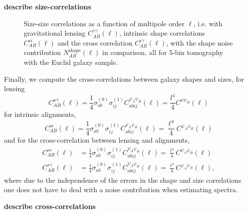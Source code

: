 \documentclass[a4paper,fleqn,usenatbib]{mnras}
\def\spirou#1{{\bf #1}}
\begin{document}
\spirou{describe size-correlations}


\begin{figure}
\centering
\caption{Size-size correlations as a function of multipole order $\ell$, i.e. with gravitational lensing $C_{AB}^{\gamma\gamma}(\ell)$, intrinsic shape correlations $C_{AB}^{\epsilon\epsilon}(\ell)$ and the cross correlation $C_{AB}^{\epsilon\gamma}(\ell)$, with the shape noise contribution $N_{AB}^\mathrm{shape}(\ell)$ in comparison, all for 5-bin tomography with the Euclid galaxy sample.}
\label{fig:sizesize}
\end{figure}


Finally, we compute the cross-correlations between galaxy shapes and sizes, for lensing
\begin{equation}
C_{AB}^{\kappa\gamma}(\ell) = \frac{1}{4}\sigma^{(0)}_{ab}\sigma^{(1)}_{ij}C^{\psi_A\psi_B}_{abij}(\ell) = \frac{l^4}{4}C^{\psi\psi_B}(\ell)
\end{equation}
for intrinsic alignments,
\begin{equation}
C_{AB}^{s\epsilon}(\ell) = \frac{1}{4}\sigma^{(0)}_{ab}\sigma^{(1)}_{ij}C^{\varphi_A\varphi_B}_{abij}(\ell) = \frac{\ell^4}{4}C^{\varphi_A\varphi_B}(\ell)
\end{equation}
and for the cross-correlation between lensing and alignments,
\begin{align}
C_{AB}^{\kappa\epsilon}(\ell) & = \frac{1}{4}\sigma^{(0)}_{ab}\sigma^{(1)}_{ij}C^{\psi_A\varphi_B}_{abij}(\ell) = \frac{\ell^4}{4}C^{\psi_A\varphi_B}(\ell)\\
C_{AB}^{s\gamma}(\ell) & = \frac{1}{4}\sigma^{(0)}_{ab}\sigma^{(1)}_{ij}C^{\psi_A\varphi_B}_{abij}(\ell) = \frac{\ell^4}{4}C^{\varphi_A\psi_B}(\ell),
\end{align}
where due to the independence of the errors in the shape and size correlations one does not have to deal with a noise contribution when estimating spectra.

\spirou{describe cross-correlations}


\end{document}
